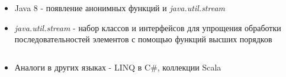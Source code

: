 \begin{frame}
\frametitle{\insertsection} 
\framesubtitle{\insertsubsection}
\begin{itemize}
	\item Java 8 - появление анонимных функций и \textit{java.util.stream}
	\item \textit{java.util.stream} - набор классов и интерфейсов для упрощения обработки последовательностей элементов с помощью функций высших порядков
	\inputminted{java}{code/StreamsExample.java}
	\item Аналоги в других языках - LINQ в C\#, коллекции Scala
\end{itemize}
\end{frame}